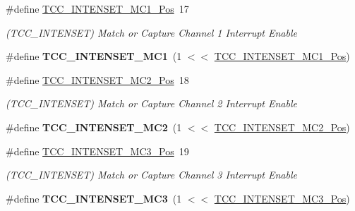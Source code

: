 \begin{DoxyCompactItemize}
\item 
\hypertarget{group___s_a_m_l21___t_c_c_gaf994474b8127e42d0166faf39d663494}{}\#define \hyperlink{group___s_a_m_l21___t_c_c_gaf994474b8127e42d0166faf39d663494}{T\+C\+C\+\_\+\+I\+N\+T\+E\+N\+S\+E\+T\+\_\+\+M\+C1\+\_\+\+Pos}~17\label{group___s_a_m_l21___t_c_c_gaf994474b8127e42d0166faf39d663494}

\begin{DoxyCompactList}\small\item\em (T\+C\+C\+\_\+\+I\+N\+T\+E\+N\+S\+E\+T) Match or Capture Channel 1 Interrupt Enable \end{DoxyCompactList}\item 
\hypertarget{group___s_a_m_l21___t_c_c_ga4e04eb967076555e792d4b449a5b0e83}{}\#define {\bfseries T\+C\+C\+\_\+\+I\+N\+T\+E\+N\+S\+E\+T\+\_\+\+M\+C1}~(1 $<$$<$ \hyperlink{group___s_a_m_l21___t_c_c_gaf994474b8127e42d0166faf39d663494}{T\+C\+C\+\_\+\+I\+N\+T\+E\+N\+S\+E\+T\+\_\+\+M\+C1\+\_\+\+Pos})\label{group___s_a_m_l21___t_c_c_ga4e04eb967076555e792d4b449a5b0e83}

\item 
\hypertarget{group___s_a_m_l21___t_c_c_gabd77a519d05b084281f871774d8a1025}{}\#define \hyperlink{group___s_a_m_l21___t_c_c_gabd77a519d05b084281f871774d8a1025}{T\+C\+C\+\_\+\+I\+N\+T\+E\+N\+S\+E\+T\+\_\+\+M\+C2\+\_\+\+Pos}~18\label{group___s_a_m_l21___t_c_c_gabd77a519d05b084281f871774d8a1025}

\begin{DoxyCompactList}\small\item\em (T\+C\+C\+\_\+\+I\+N\+T\+E\+N\+S\+E\+T) Match or Capture Channel 2 Interrupt Enable \end{DoxyCompactList}\item 
\hypertarget{group___s_a_m_l21___t_c_c_ga255a356fe3441202020fca2355c3af68}{}\#define {\bfseries T\+C\+C\+\_\+\+I\+N\+T\+E\+N\+S\+E\+T\+\_\+\+M\+C2}~(1 $<$$<$ \hyperlink{group___s_a_m_l21___t_c_c_gabd77a519d05b084281f871774d8a1025}{T\+C\+C\+\_\+\+I\+N\+T\+E\+N\+S\+E\+T\+\_\+\+M\+C2\+\_\+\+Pos})\label{group___s_a_m_l21___t_c_c_ga255a356fe3441202020fca2355c3af68}

\item 
\hypertarget{group___s_a_m_l21___t_c_c_ga8bd95abf745b954c0ab60a12037657a2}{}\#define \hyperlink{group___s_a_m_l21___t_c_c_ga8bd95abf745b954c0ab60a12037657a2}{T\+C\+C\+\_\+\+I\+N\+T\+E\+N\+S\+E\+T\+\_\+\+M\+C3\+\_\+\+Pos}~19\label{group___s_a_m_l21___t_c_c_ga8bd95abf745b954c0ab60a12037657a2}

\begin{DoxyCompactList}\small\item\em (T\+C\+C\+\_\+\+I\+N\+T\+E\+N\+S\+E\+T) Match or Capture Channel 3 Interrupt Enable \end{DoxyCompactList}\item 
\hypertarget{group___s_a_m_l21___t_c_c_gaa741cf718cf6d6298bbf45bfa9ab601c}{}\#define {\bfseries T\+C\+C\+\_\+\+I\+N\+T\+E\+N\+S\+E\+T\+\_\+\+M\+C3}~(1 $<$$<$ \hyperlink{group___s_a_m_l21___t_c_c_ga8bd95abf745b954c0ab60a12037657a2}{T\+C\+C\+\_\+\+I\+N\+T\+E\+N\+S\+E\+T\+\_\+\+M\+C3\+\_\+\+Pos})\label{group___s_a_m_l21___t_c_c_gaa741cf718cf6d6298bbf45bfa9ab601c}


\end{DoxyCompactItemize}
